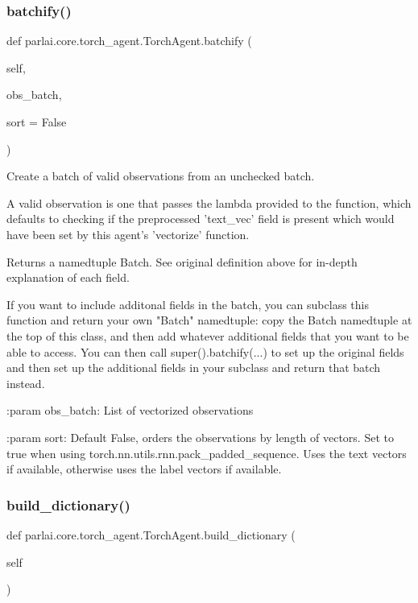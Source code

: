 \subsubsection{\texorpdfstring{batchify()}{batchify()}}
{\footnotesize\ttfamily def parlai.\+core.\+torch\+\_\+agent.\+Torch\+Agent.\+batchify (\begin{DoxyParamCaption}\item[{}]{self,  }\item[{}]{obs\+\_\+batch,  }\item[{}]{sort = {\ttfamily False} }\end{DoxyParamCaption})}

\begin{DoxyVerb}Create a batch of valid observations from an unchecked batch.

A valid observation is one that passes the lambda provided to the
function, which defaults to checking if the preprocessed 'text_vec'
field is present which would have been set by this agent's 'vectorize'
function.

Returns a namedtuple Batch. See original definition above for in-depth
explanation of each field.

If you want to include additonal fields in the batch, you can subclass
this function and return your own "Batch" namedtuple: copy the Batch
namedtuple at the top of this class, and then add whatever additional
fields that you want to be able to access. You can then call
super().batchify(...) to set up the original fields and then set up the
additional fields in your subclass and return that batch instead.

:param obs_batch:
    List of vectorized observations

:param sort:
    Default False, orders the observations by length of vectors. Set to
    true when using torch.nn.utils.rnn.pack_padded_sequence.  Uses the text
    vectors if available, otherwise uses the label vectors if available.
\end{DoxyVerb}
 \mbox{\label{classparlai_1_1core_1_1torch__agent_1_1TorchAgent_a233316f9ec2805dd6a08fbf07f3a078a}} 
\subsubsection{\texorpdfstring{build\+\_\+dictionary()}{build\_dictionary()}}
{\footnotesize\ttfamily def parlai.\+core.\+torch\+\_\+agent.\+Torch\+Agent.\+build\+\_\+dictionary (\begin{DoxyParamCaption}\item[{}]{self }\end{DoxyParamCaption})}

